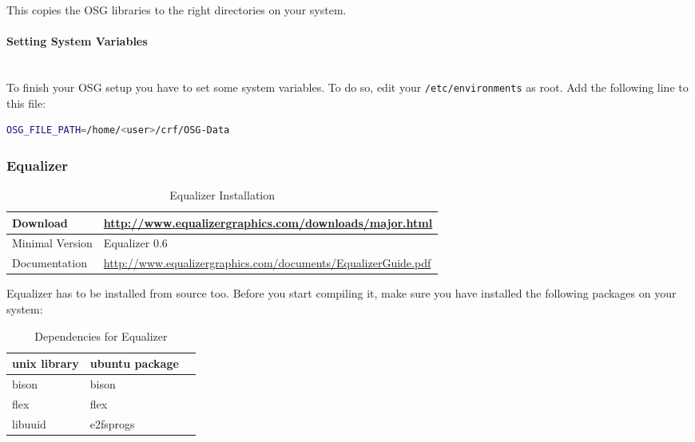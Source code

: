 This copies the OSG libraries to the right directories on your system.

\paragraph{Setting System Variables}\hfill\\
To finish your OSG setup you have to set some system variables. To do so, edit your \texttt{/etc/environments} as root. Add the following line to this file:

\begin{lstlisting}[language=bash,caption={/etc/environment}]
OSG_FILE_PATH=/home/<user>/crf/OSG-Data
\end{lstlisting}


\subsubsection{Equalizer}

\begin{table}[H]
	\centering
	\begin{tabular}{|p{}|p{}|}
		\hline Download & \href{http://www.equalizergraphics.com/downloads/major.html}{http://www.equalizergraphics.com/downloads/major.html} \\
		\hline Minimal Version & Equalizer 0.6 \\
		\hline Documentation & \href{http://www.equalizergraphics.com/documents/EqualizerGuide.pdf}{http://www.equalizergraphics.com/documents/EqualizerGuide.pdf} \\
		\hline
	\end{tabular}
	\caption{Equalizer Installation}
\end{table}

Equalizer has to be installed from source too. Before you start compiling it, make sure you have installed the following packages on your system:

\begin{table}[H]
\centering
\begin{tabular}{|l|l|l|}
\hline \bfseries unix library  & \bfseries ubuntu package \\ 
\hline
\hline  bison & bison \\ 
\hline  flex & flex  \\ 
\hline  libuuid & e2fsprogs  \\
\hline
\end{tabular} 
\caption{Dependencies for Equalizer}
\end{table}

